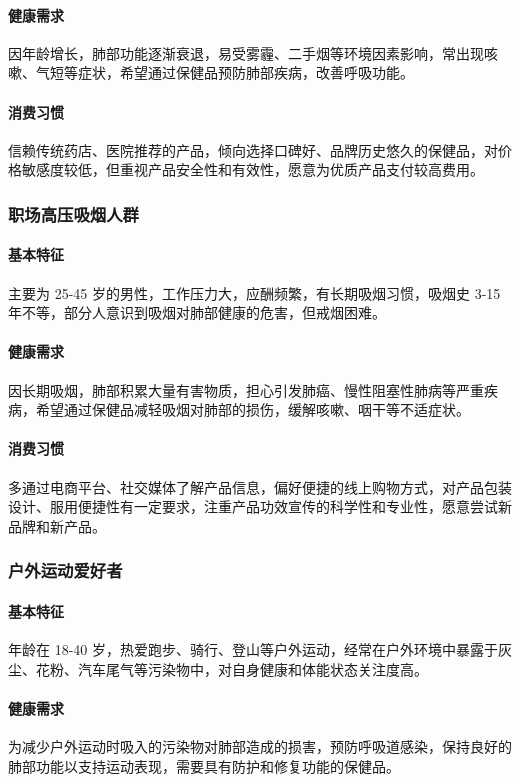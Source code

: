 \documentclass[12pt]{ctexart}
\begin{document}
\paragraph{健康需求}
因年龄增长，肺部功能逐渐衰退，易受雾霾、二手烟等环境因素影响，常出现咳嗽、气短等症状，希望通过保健品预防肺部疾病，改善呼吸功能。
\paragraph{消费习惯}
信赖传统药店、医院推荐的产品，倾向选择口碑好、品牌历史悠久的保健品，对价格敏感度较低，但重视产品安全性和有效性，愿意为优质产品支付较高费用。
\subsubsection{职场高压吸烟人群}
\paragraph{基本特征}
主要为 25-45 岁的男性，工作压力大，应酬频繁，有长期吸烟习惯，吸烟史 3-15 年不等，部分人意识到吸烟对肺部健康的危害，但戒烟困难。
\paragraph{健康需求}
因长期吸烟，肺部积累大量有害物质，担心引发肺癌、慢性阻塞性肺病等严重疾病，希望通过保健品减轻吸烟对肺部的损伤，缓解咳嗽、咽干等不适症状。
\paragraph{消费习惯}
多通过电商平台、社交媒体了解产品信息，偏好便捷的线上购物方式，对产品包装设计、服用便捷性有一定要求，注重产品功效宣传的科学性和专业性，愿意尝试新品牌和新产品。
\subsubsection{户外运动爱好者}
\paragraph{基本特征}
年龄在 18-40 岁，热爱跑步、骑行、登山等户外运动，经常在户外环境中暴露于灰尘、花粉、汽车尾气等污染物中，对自身健康和体能状态关注度高。
\paragraph{健康需求}
为减少户外运动时吸入的污染物对肺部造成的损害，预防呼吸道感染，保持良好的肺部功能以支持运动表现，需要具有防护和修复功能的保健品。
\end{document}
